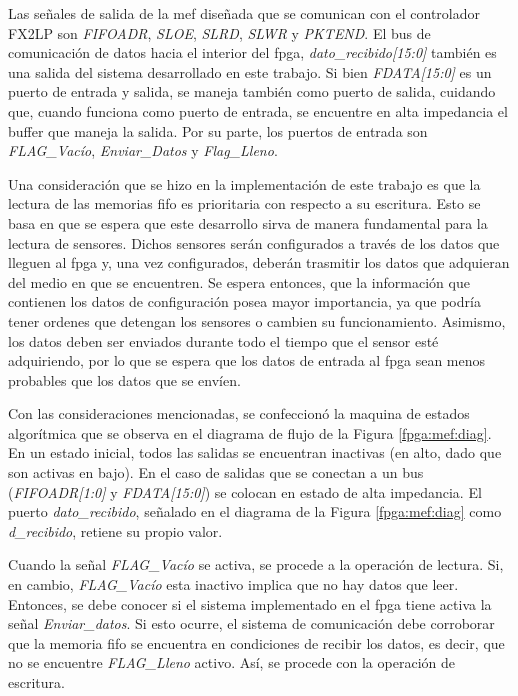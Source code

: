 Las señales de salida de la \acrshort{mef} diseñada que se comunican con el controlador FX2LP son {\it FIFOADR}, {\it SLOE}, {\it SLRD}, {\it SLWR} y {\it  PKTEND}. El bus de comunicación de datos hacia el interior del \acrshort{fpga}, {\it dato\_recibido[15:0]} también es una salida del sistema desarrollado en este trabajo. Si bien {\it FDATA[15:0]} es un puerto de entrada y salida, se maneja también como puerto de salida, cuidando que, cuando funciona como puerto de entrada, se encuentre en alta impedancia el buffer que maneja la salida. Por su parte, los puertos de entrada son {\it FLAG\_Vacío}, {\it Enviar\_Datos} y {\it Flag\_Lleno}.

Una consideración que se hizo en la implementación de este trabajo es que la lectura de las memorias \acrshort{fifo} es prioritaria con respecto a su escritura. Esto se basa en que se espera que este desarrollo sirva de manera fundamental para la lectura de sensores. Dichos sensores serán configurados a través de los datos que lleguen al \acrshort{fpga} y, una vez configurados, deberán trasmitir los datos que adquieran del medio en que se encuentren. Se espera entonces, que la información que contienen los datos de configuración posea mayor importancia, ya que podría tener ordenes que detengan los sensores o cambien su funcionamiento. Asimismo, los datos deben ser enviados durante todo el tiempo que el sensor esté adquiriendo, por lo que se espera que los datos de entrada al \acrshort{fpga} sean menos probables que los datos que se envíen.

Con las consideraciones mencionadas, se confeccionó la maquina de estados algorítmica que se observa en el diagrama de flujo de la Figura \ref{fpga:mef:diag}. En un estado inicial, todos las salidas se encuentran inactivas (en alto, dado que son activas en bajo). En el caso de salidas que se conectan a un bus ({\it FIFOADR[1:0]} y {\it FDATA[15:0]}) se colocan en estado de alta impedancia. El puerto {\it dato\_recibido}, señalado en el diagrama de la Figura \ref{fpga:mef:diag} como {\it d\_recibido}, retiene su propio valor.

Cuando la señal {\it FLAG\_Vacío} se activa, se procede a la operación de lectura. Si, en cambio, {\it FLAG\_Vacío} esta inactivo implica que no hay datos que leer. Entonces, se debe conocer si el sistema implementado en el \acrshort{fpga} tiene activa la señal {\it Enviar\_datos}. Si esto ocurre, el sistema de comunicación debe corroborar que la memoria \acrshort{fifo} se encuentra en condiciones de recibir los datos, es decir, que no se encuentre {\it FLAG\_Lleno} activo. Así, se procede con la operación de escritura.

